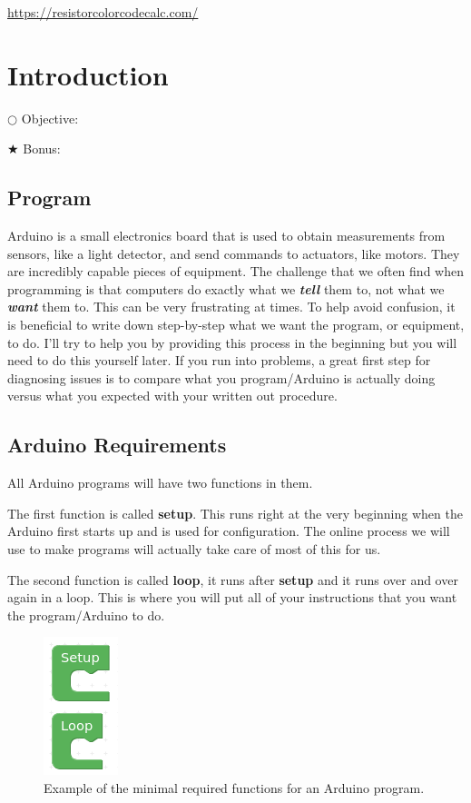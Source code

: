\documentclass[12pt]{article}
\begin{document}
	
	
	\url{https://resistorcolorcodecalc.com/}
	
	\section{Introduction}
	
	
	\noindent $\bigcirc$ Objective: 
	
	\noindent $\bigstar$ Bonus: 
	
	\subsection{Program}
	
	Arduino is a small electronics board that is used to obtain measurements from sensors, like a light detector, and send commands to actuators, like motors. They are incredibly capable pieces of equipment. The challenge that we often find when programming is that computers do exactly what we \textbf{\textit{tell}} them to, not what we \textbf{\textit{want}} them to. This can be very frustrating at times. To help avoid confusion, it is beneficial to write down step-by-step what we want the program, or equipment, to do. I'll try to help you by providing this process in the beginning but you will need to do this yourself later. If you run into problems, a great first step for diagnosing issues is to compare what you program/Arduino is actually doing versus what you expected with your written out procedure.
	
	\subsection{Arduino Requirements}
	
	All Arduino programs will have two functions in them.
	
	The first function is called \textbf{setup}. This runs right at the very beginning when the Arduino first starts up and is used for configuration. The online process we will use to make programs will actually take care of most of this for us.
	
	The second function is called \textbf{loop}, it runs after \textbf{setup} and it runs over and over again in a loop. This is where you will put all of your instructions that you want the program/Arduino to do.
	
	\begin{figure}[H]
		\begin{center}
			\includegraphics[scale=0.7]{p_minimal_program}
			\caption{Example of the minimal required functions for an Arduino program.}
			\label{prog:minimal_program}
		\end{center}
	\end{figure}
	
\end{document}
